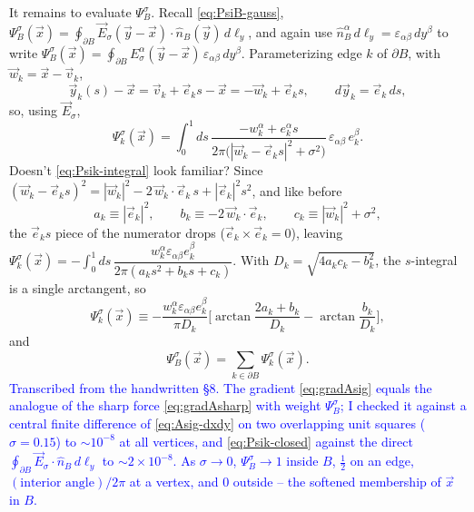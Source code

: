 \documentclass[11pt]{article}
\numberwithin{equation}{section}
\newcommand{\vv}[1]{\vec{#1}}
\newcommand{\eps}{\varepsilon}
\newcommand{\cam}[1]{\textcolor{blue}{#1}}
\begin{document}
It remains to evaluate $\Psi_B^\sigma$. Recall \eqref{eq:PsiB-gauss}, $\Psi_B^\sigma(\vv x)
=\oint_{\partial B}\vv E_\sigma(\vv y-\vv x)\!\cdot\!\hat n_B(\vv y)\,d\ell_y$, and again use
$\hat n_B^\alpha\,d\ell_y=\eps_{\alpha\beta}\,dy^\beta$ to write $\Psi_B^\sigma(\vv x)
=\oint_{\partial B}E_\sigma^\alpha(\vv y-\vv x)\,\eps_{\alpha\beta}\,dy^\beta$. Parameterizing edge $k$
of $\partial B$, with $\vv w_k=\vv x-\vv v_k$,
\[
  \vv y_k(s)-\vv x=\vv v_k+\vv e_k s-\vv x=-\vv w_k+\vv e_k s,\qquad d\vv y_k=\vv e_k\,ds,
\]
so, using $\vv E_\sigma$,
\begin{equation}\label{eq:Psik-integral}
  \Psi_k^\sigma(\vv x)=\int_0^1 ds\,\frac{-w_k^\alpha+e_k^\alpha s}{2\pi\big(|\vv w_k-\vv e_k s|^2
  +\sigma^2\big)}\,\eps_{\alpha\beta}\,e_k^\beta .
\end{equation}
Doesn't \eqref{eq:Psik-integral} look familiar? Since $(\vv w_k-\vv e_k s)^2=|\vv w_k|^2-2\,\vv
w_k\!\cdot\!\vv e_k\,s+|\vv e_k|^2 s^2$, and like before
\[
  a_k\equiv|\vv e_k|^2,\qquad b_k\equiv-2\,\vv w_k\!\cdot\!\vv e_k,\qquad c_k\equiv|\vv w_k|^2+\sigma^2 ,
\]
the $\vv e_k s$ piece of the numerator drops ($\vv e_k\times\vv e_k=0$), leaving $\Psi_k^\sigma(\vv x)
=-\int_0^1 ds\,\dfrac{w_k^\alpha\eps_{\alpha\beta}e_k^\beta}{2\pi(a_k s^2+b_k s+c_k)}$. With
$D_k=\sqrt{4a_kc_k-b_k^2}$, the $s$-integral is a single arctangent, so
\begin{equation}\label{eq:Psik-closed}
  \Psi_k^\sigma(\vv x)\equiv-\frac{w_k^\alpha\eps_{\alpha\beta}e_k^\beta}{\pi D_k}
  \Big[\arctan\frac{2a_k+b_k}{D_k}-\arctan\frac{b_k}{D_k}\Big],
\end{equation}
and
\begin{equation}\label{eq:PsiB-sum}
  \Psi_B^\sigma(\vv x)=\sum_{k\in\partial B}\Psi_k^\sigma(\vv x).
\end{equation}
\cam{Transcribed from the handwritten \S8. The gradient \eqref{eq:gradAsig} equals the analogue of the
sharp force \eqref{eq:gradAsharp} with weight $\Psi_B^\sigma$; I checked it against a central finite
difference of \eqref{eq:Asig-dxdy} on two overlapping unit squares ($\sigma=0.15$) to $\sim10^{-8}$ at
all vertices, and \eqref{eq:Psik-closed} against the direct $\oint_{\partial B}\vv E_\sigma\!\cdot\!\hat
n_B\,d\ell_y$ to $\sim2\times10^{-8}$. As $\sigma\to0$, $\Psi_B^\sigma\to1$ inside $B$, $\tfrac12$ on an
edge, $(\text{interior angle})/2\pi$ at a vertex, and $0$ outside -- the softened membership of $\vv x$
in $B$.}
\end{document}
